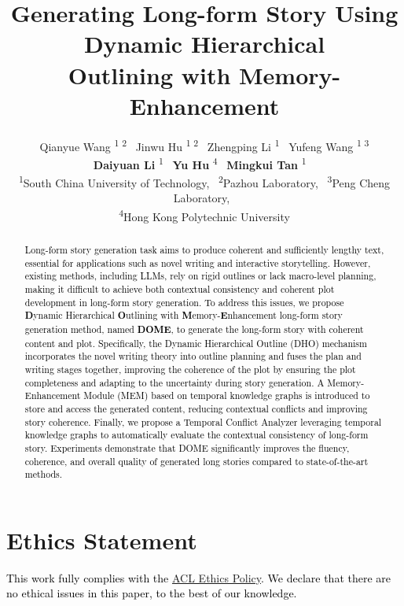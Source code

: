\documentclass[11pt]{article}
\title{Generating Long-form Story Using Dynamic Hierarchical \\Outlining with Memory-Enhancement}
\author{
    Qianyue Wang \textsuperscript{\rm 1 \rm 2}\footnotemark[1]~
    Jinwu Hu \textsuperscript{\rm 1 \rm 2}\footnotemark[1]~
    Zhengping Li \textsuperscript{\rm 1}~
    Yufeng Wang \textsuperscript{\rm 1 \rm 3}\\
    \textbf{Daiyuan Li} \textsuperscript{\rm 1}~
    \textbf{Yu Hu} \textsuperscript{\rm 4}~ 
    \textbf{Mingkui Tan} \textsuperscript{\rm 1} \footnotemark[2] ~\\ 
    \textsuperscript{\scriptsize{\rm 1}}\small{South China University of Technology,}~
    \textsuperscript{\rm 2}\small{Pazhou Laboratory,}~
    \textsuperscript{\rm 3}\small{Peng Cheng Laboratory,}~ \\
    \textsuperscript{\rm 4}\small{Hong Kong Polytechnic University}\\
}
\def\hjw{\textcolor{black}}
\def\wqyr{\textcolor{black}}
\begin{document}
\maketitle
{} 

\begin{abstract}
\hjw{Long-form story generation task aims to produce coherent and sufficiently lengthy text, essential for applications such as novel writing and interactive storytelling. \wqyr{However, existing methods, including LLMs, rely on rigid outlines or lack macro-level planning, making it difficult to achieve both contextual consistency and coherent plot development in long-form story generation.} To address \wqyr{this} issues, we propose \textbf{D}ynamic Hierarchical \textbf{O}utlining with \textbf{M}emory-\textbf{E}nhancement long-form story generation method, named \textbf{DOME}, to generate the long-form story with coherent content and plot. Specifically, the Dynamic Hierarchical Outline (DHO) mechanism incorporates the novel writing theory into outline planning and fuses the plan and writing stages together, improving the coherence of the plot by ensuring the plot completeness and \wqyr{adapting to the uncertainty during story generation. }%
A Memory-Enhancement Module (MEM) based on temporal knowledge graphs is introduced to store and access \wqyr{the} generated content, reducing contextual conflicts and improving story coherence. Finally, we propose a Temporal Conflict Analyzer leveraging temporal knowledge graphs to \wqyr{automatically} evaluate the contextual consistency of long-form story. 
Experiments demonstrate that DOME significantly improves the fluency, coherence, and overall quality of generated long stories compared to state-of-the-art methods.}
\end{abstract}














\newpage



\section*{Ethics Statement}
\hjw{This work fully complies with the \href{https://www.aclweb.org/portal/content/acl-code-ethics}{ACL Ethics Policy}. We declare that there are no ethical issues in this paper, to the best of our knowledge.}


\newpage

\end{document}
